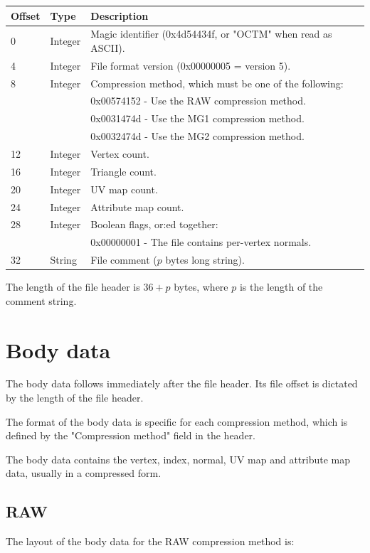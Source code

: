 \begin{tabular}{|l|l|l|}\hline
\textbf{Offset} &  \textbf{Type} & \textbf{Description}\\ \hline
0 & Integer & Magic identifier (0x4d54434f, or "OCTM" when read as ASCII).\\ \hline
4 & Integer & File format version (0x00000005 = version 5).\\ \hline
8 & Integer & Compression method, which must be one of the following:\\
 & & 0x00574152 - Use the RAW compression method.\\
 & & 0x0031474d - Use the MG1 compression method.\\
 & & 0x0032474d - Use the MG2 compression method.\\ \hline
12 & Integer & Vertex count.\\ \hline
16 & Integer & Triangle count.\\ \hline
20 & Integer & UV map count.\\ \hline
24 & Integer & Attribute map count.\\ \hline
28 & Integer & Boolean flags, or:ed together:\\
 & & 0x00000001 - The file contains per-vertex normals.\\ \hline
32 & String & File comment ($p$ bytes long string).\\ \hline
\end{tabular}

The length of the file header is $36+p$ bytes, where $p$ is the length of the
comment string.



\chapter{Body data}
The body data follows immediately after the file header. Its file offset is
dictated by the length of the file header.

The format of the body data is specific for each compression method, which is
defined by the "Compression method" field in the header.

The body data contains the vertex, index, normal, UV map and attribute map
data, usually in a compressed form.


\section{RAW}
The layout of the body data for the RAW compression method is:

